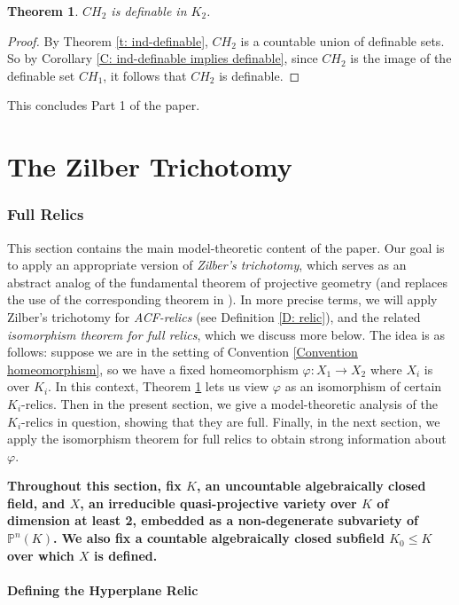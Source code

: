 \documentclass{amsart}
\newtheorem{theorem}{Theorem}[section]
\theoremstyle{definition}
\begin{document}
\begin{theorem}\label{T: definability of hyperplane images}
$CH_2$ is definable in $K_2$.
\end{theorem}
\begin{proof}
    By Theorem \ref{t: ind-definable}, $CH_2$ is a countable union of definable sets. So by Corollary \ref{C: ind-definable implies definable}, since $CH_2$ is the image of the definable set $CH_1$, it follows that $CH_2$ is definable.
\end{proof}

This concludes Part 1 of the paper.

\part{The Zilber Trichotomy}

\section{Full Relics}

This section contains the main model-theoretic content of the paper. Our goal is to apply an appropriate version of \textit{Zilber's trichotomy}, which serves as an abstract analog of the fundamental theorem of projective geometry (and replaces the use of the corresponding theorem in \cite{KLOS}). In more precise terms, we will apply Zilber's trichotomy for \textit{ACF-relics} (see Definition \ref{D: relic}), and the related \textit{isomorphism theorem for full relics}, which we discuss more below. The idea is as follows: suppose we are in the setting of Convention \ref{Convention homeomorphism}, so we have a fixed homeomorphism $\varphi:X_1\rightarrow X_2$ where $X_i$ is over $K_i$. In this context, Theorem \ref{T: definability of hyperplane images} lets us view $\varphi$ as an isomorphism of certain $K_i$-relics. Then in the present section, we give a model-theoretic analysis of the $K_i$-relics in question, showing that they are full. Finally, in the next section, we apply the isomorphism theorem for full relics to obtain strong information about $\varphi$.

\textbf{Throughout this section, fix $K$, an uncountable algebraically closed field, and $X$, an irreducible quasi-projective variety over $K$ of dimension at least 2, embedded as a non-degenerate subvariety of $\mathbb P^n(K)$. We also fix a countable algebraically closed subfield $K_0\leq K$ over which $X$ is defined.}

\subsection{Defining the Hyperplane Relic}
\end{document}
